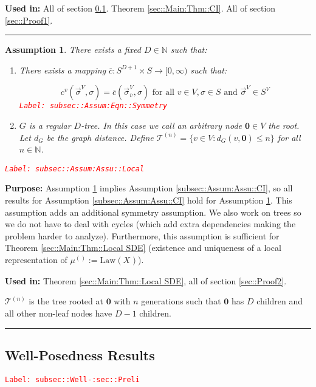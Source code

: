 \documentclass[12pt]{article}
\newcommand{\mb}{\mathbb}
\newcommand{\mc}{\mathcal}
\newcommand{\ra}{\rightarrow}
\newcommand{\ov}{\overline}
\newcommand{\te}{\text}
\newcommand{\tr}{\textcolor{red}}
\newcommand{\labe}[1]{\tr{\texttt{Label: #1}}}
\newcommand{\purpose}{\textbf{Purpose: }}
\newcommand{\usein}{\textbf{Used in: }}
\newcommand{\ind}{\hspace{24pt}}
\newcommand{\lin}{\rule{\linewidth}{0.4 pt}}
\newcommand{\defeq}{:=}								%
\renewcommand{\root}{\mathbf{0}}				%
\renewcommand{\v}{v}							%
\renewcommand{\S}{S}							%
\newcommand{\s}{\sigma}							%
\newcommand{\sv}{\vec{\s}}						%
\newcommand{\X}{X}								%
\newcommand{\IGr}{c}							%
\newcommand{\vind}[1]{^{#1}}					%
\newcommand{\carp}[1]{^{#1}}					%
\newcommand{\vsi}[1]{^{#1}}						%
\newcommand{\cind}[1]{_{#1}}					%
\newcommand{\cl}{\ov}							%
\newcommand{\tip}[1]{#1}						%
\newcommand{\ts}[1]{_{#1}}						%
\newcommand{\degr}{D}							%
\newcommand{\IGrg}{\ov{c}}						%
\newcommand{\gdist}{d_G}						%
\newcommand{\tree}{\mc{T}}						%
\newcommand{\sln}[1]{^{(#1)}}					%
\newcommand{\m}{\mu}							%
\newcommand{\law}{\te{Law}}						%
\newtheorem{assu}[thms]{Assumption}
\begin{document}
\usein All of section \ref{subsec::Well-:sec::Preli}. Theorem \ref{sec::Main:Thm::CI}. All of section \ref{sec::Proof1}.

\lin

\begin{assu}
There exists a fixed \(\degr\in \mb{N}\) such that:

\begin{enumerate}
\item There exists a mapping \(\IGrg: \S\carp{\degr+1} \times \S \ra [0,\infty)\) such that:

\begin{equation}
\IGr\vind{\v}(\sv\cind{}\vsi{V},\s) = \IGrg(\sv\cind{\cl{\v}}\vsi{V},\s) \te{ for all } \v\in V, \s\in \S\te{ and } \sv\cind{}\vsi{V} \in \S\carp{V}
\label{subsec::Assum:Eqn::Symmetry}
\end{equation}
\labe{subsec::Assum:Eqn::Symmetry}

\item \(G\) is a regular \(\degr\)-tree. In this case we call an arbitrary node \(\root\in V\) the root. Let \(\gdist\) be the graph distance. Define \(\tree\sln{n} = \{\v \in V: \gdist(\v,\root) \leq n\}\) for all \(n\in \mb{N}\).
\end{enumerate}
\label{subsec::Assum:Assu::Local}\labe{subsec::Assum:Assu::Local}
\end{assu}

\purpose Assumption \ref{subsec::Assum:Assu::Local} implies Assumption \ref{subsec::Assum:Assu::CI}, so all results for Assumption \ref{subsec::Assum:Assu::CI} hold for Assumption \ref{subsec::Assum:Assu::Local}. This assumption adds an additional symmetry assumption. We also work on trees so we do not have to deal with cycles (which add extra dependencies making the problem harder to analyze). Furthermore, this assumption is sufficient for Theorem \ref{sec::Main:Thm::Local SDE} (existence and uniqueness of a local representation of \(\m\sln{}\ts{} \defeq \law(\X\cind{}\tip{})\)).

\usein Theorem \ref{sec::Main:Thm::Local SDE}, all of section \ref{sec::Proof2}.

\ind \(\tree\sln{n}\) is the tree rooted at \(\root\) with \(n\) generations such that \(\root\) has \(\degr\) children and all other non-leaf nodes have \(\degr-1\) children.

\lin

\subsection{Well-Posedness Results}
\label{subsec::Well-:sec::Preli}\labe{subsec::Well-:sec::Preli}
\end{document}
